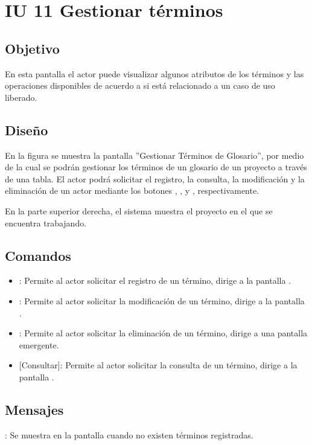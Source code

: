 \section{IU 11 Gestionar términos}

\subsection{Objetivo}
	En esta pantalla el actor puede visualizar algunos atributos de los términos y las operaciones disponibles de acuerdo a si está relacionado a un caso de uso liberado.
\subsection{Diseño}
	En la figura  se muestra la pantalla ''Gestionar Términos de Glosario'', por medio de la cual se podrán gestionar los términos de un glosario de un proyecto a través de una tabla. El actor podrá solicitar el registro, la consulta, la modificación y la eliminación de un actor mediante los botones , , \editar y \eliminar, respectivamente.
	
	En la parte superior derecha, el sistema muestra el proyecto en el que se encuentra trabajando.

\subsection{Comandos}
\begin{itemize}
	\item {}: Permite al actor solicitar el registro de un término, dirige a la pantalla .
	\item \editar [Modificar]: Permite al actor solicitar la modificación de un término, dirige a la pantalla .
	\item \eliminar [Eliminar]: Permite al actor solicitar la eliminación de un término, dirige a una pantalla emergente.
	\item {} [Consultar]: Permite al actor solicitar la consulta de un término, dirige a la pantalla  .
\end{itemize}
\subsection{Mensajes}

\begin{Citemize}
	\item {}: Se muestra en la pantalla  cuando no existen términos registradas.
\end{Citemize}
